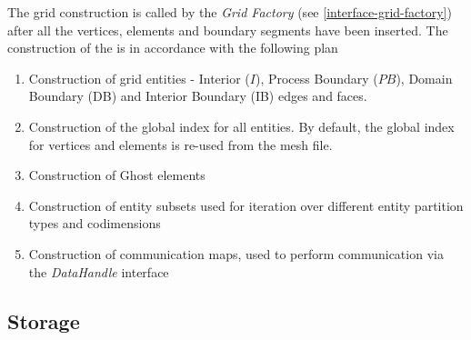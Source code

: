 
The grid construction is called by the \textit{Grid Factory} (see \ref{interface-grid-factory}) after all the vertices, elements and boundary segments have been inserted. The construction of the \curvgrid{} is in accordance with the following plan

\begin{mybox}
\begin{enumerate}
	\item Construction of grid entities - Interior ($I$), Process Boundary ($PB$), Domain Boundary (DB) and Interior Boundary (IB) edges and faces.
	\item Construction of the global index for all entities. By default, the global index for vertices and elements is re-used from the mesh file.
	\item Construction of Ghost elements
	\item Construction of entity subsets used for iteration over different entity partition types and codimensions
	\item Construction of communication maps, used to perform communication via the \textit{DataHandle} interface
\end{enumerate}
\end{mybox}


\subsection{Storage}
\label{impl-grid-storage}

